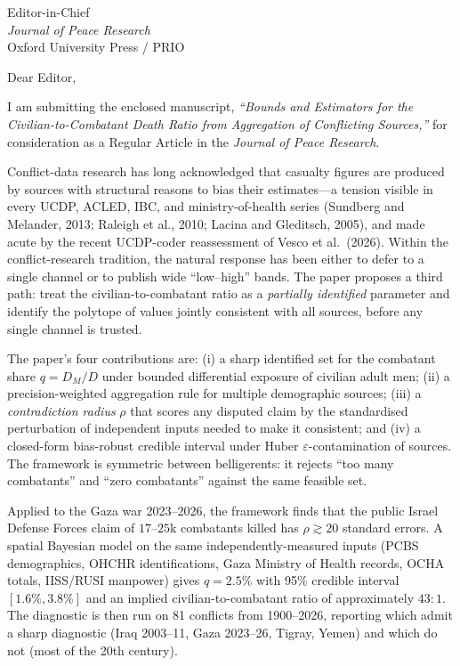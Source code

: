 \documentclass[11pt]{letter}
\begin{document}
\begin{letter}{Editor-in-Chief\\ \emph{Journal of Peace Research}\\ Oxford University Press / PRIO}

\opening{Dear Editor,}

I am submitting the enclosed manuscript, \emph{``Bounds and Estimators for the Civilian-to-Combatant Death Ratio from Aggregation of Conflicting Sources,''} for consideration as a Regular Article in the \emph{Journal of Peace Research}.

Conflict-data research has long acknowledged that casualty figures are produced by sources with structural reasons to bias their estimates---a tension visible in every UCDP, ACLED, IBC, and ministry-of-health series (Sundberg and Melander, 2013; Raleigh et al., 2010; Lacina and Gleditsch, 2005), and made acute by the recent UCDP-coder reassessment of Vesco et al.\ (2026). Within the conflict-research tradition, the natural response has been either to defer to a single channel or to publish wide ``low--high'' bands. The paper proposes a third path: treat the civilian-to-combatant ratio as a \emph{partially identified} parameter and identify the polytope of values jointly consistent with all sources, before any single channel is trusted.

The paper's four contributions are: (i) a sharp identified set for the combatant share $q=D_M/D$ under bounded differential exposure of civilian adult men; (ii) a precision-weighted aggregation rule for multiple demographic sources; (iii) a \emph{contradiction radius} $\rho$ that scores any disputed claim by the standardised perturbation of independent inputs needed to make it consistent; and (iv) a closed-form bias-robust credible interval under Huber $\varepsilon$-contamination of sources. The framework is symmetric between belligerents: it rejects ``too many combatants'' and ``zero combatants'' against the same feasible set.

Applied to the Gaza war 2023--2026, the framework finds that the public Israel Defense Forces claim of $17$--$25$k combatants killed has $\rho\gtrsim 20$ standard errors. A spatial Bayesian model on the same independently-measured inputs (PCBS demographics, OHCHR identifications, Gaza Ministry of Health records, OCHA totals, IISS/RUSI manpower) gives $q=2.5\%$ with 95\% credible interval $[1.6\%,3.8\%]$ and an implied civilian-to-combatant ratio of approximately $43{:}1$. The diagnostic is then run on 81 conflicts from 1900--2026, reporting which admit a sharp diagnostic (Iraq 2003--11, Gaza 2023--26, Tigray, Yemen) and which do not (most of the 20th century).


\end{letter}
\end{document}
